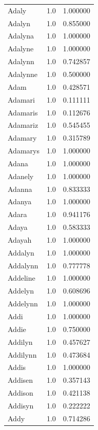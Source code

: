 \documentclass[
  letterpaper,
  DIV=11,
  numbers=noendperiod]{scrreprt}
\begin{document}
\begin{tabular}{lrr}
Adaly           &   1.0 &   1.000000 \\
Adalyn          &   1.0 &   0.855000 \\
Adalyna         &   1.0 &   1.000000 \\
Adalyne         &   1.0 &   1.000000 \\
Adalynn         &   1.0 &   0.742857 \\
Adalynne        &   1.0 &   0.500000 \\
Adam            &   1.0 &   0.428571 \\
Adamari         &   1.0 &   0.111111 \\
Adamaris        &   1.0 &   0.112676 \\
Adamariz        &   1.0 &   0.545455 \\
Adamary         &   1.0 &   0.315789 \\
Adamarys        &   1.0 &   1.000000 \\
Adana           &   1.0 &   1.000000 \\
Adanely         &   1.0 &   1.000000 \\
Adanna          &   1.0 &   0.833333 \\
Adanya          &   1.0 &   1.000000 \\
Adara           &   1.0 &   0.941176 \\
Adaya           &   1.0 &   0.583333 \\
Adayah          &   1.0 &   1.000000 \\
Addalyn         &   1.0 &   1.000000 \\
Addalynn        &   1.0 &   0.777778 \\
Addeline        &   1.0 &   1.000000 \\
Addelyn         &   1.0 &   0.608696 \\
Addelynn        &   1.0 &   1.000000 \\
Addi            &   1.0 &   1.000000 \\
Addie           &   1.0 &   0.750000 \\
Addilyn         &   1.0 &   0.457627 \\
Addilynn        &   1.0 &   0.473684 \\
Addis           &   1.0 &   1.000000 \\
Addisen         &   1.0 &   0.357143 \\
Addison         &   1.0 &   0.421138 \\
Addisyn         &   1.0 &   0.222222 \\
Addy            &   1.0 &   0.714286 \\

\end{tabular}
\end{document}
